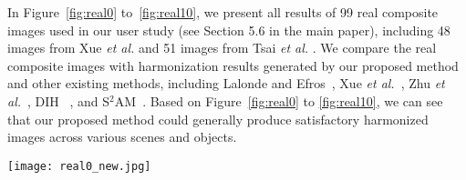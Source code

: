 \documentclass[10pt,twocolumn,letterpaper]{article}
\begin{document}
In Figure~\ref{fig:real0} to~\ref{fig:real10}, we present all results of 99 real composite images used in our user study (see Section 5.6 in the main paper), including 48 images from Xue \textit{et al.} \cite{xue2012understandingsupp} and 51 images from Tsai \textit{et al.} \cite{tsai2017deepsupp}. We compare the real composite images with harmonization results generated by our proposed method and other existing methods, including Lalonde and Efros~\cite{lalonde2007usingsupp}, Xue \textit{et al.}~\cite{xue2012understandingsupp}, Zhu \textit{et al.}~\cite{zhu2015learningsupp}, DIH ~\cite{tsai2017deepsupp}, and S$^2$AM~\cite{xiaodong2019improvingsupp}. Based on Figure~\ref{fig:real0} to \ref{fig:real10}, we can see that our proposed method could generally produce satisfactory harmonized images across various scenes and objects.


\vspace{25pt}
\begin{figure*}[hb]
\begin{center}
\texttt{[image: real0\_new.jpg]}
\end{center}
   \caption{Results on real composite images, including the input composite, five state-of-the-art methods, and our proposed DoveNet.}
\label{fig:real0}
\end{figure*}

\pagebreak
\end{document}
